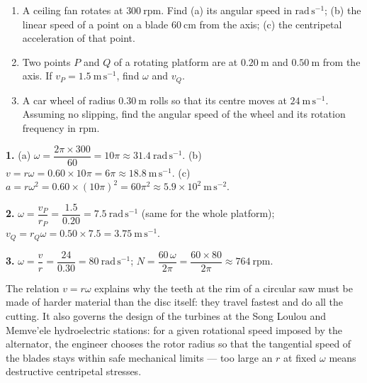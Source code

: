 \documentclass[11pt]{article}
\begin{document}
\begin{exercice}[Practice]
\begin{enumerate}
\item A ceiling fan rotates at $300\ \mathrm{rpm}$. Find (a) its angular speed in $\mathrm{rad\,s^{-1}}$; (b) the linear speed of a point on a blade $60\ \mathrm{cm}$ from the axis; (c) the centripetal acceleration of that point.
\item Two points $P$ and $Q$ of a rotating platform are at $0.20\ \mathrm{m}$ and $0.50\ \mathrm{m}$ from the axis. If $v_P = 1.5\ \mathrm{m\,s^{-1}}$, find $\omega$ and $v_Q$.
\item A car wheel of radius $0.30\ \mathrm{m}$ rolls so that its centre moves at $24\ \mathrm{m\,s^{-1}}$. Assuming no slipping, find the angular speed of the wheel and its rotation frequency in rpm.
\end{enumerate}
\end{exercice}

\begin{corrige}[Exercise 1]
\textbf{1.} (a) $\omega = \dfrac{2\pi \times 300}{60} = 10\pi \approx 31.4\ \mathrm{rad\,s^{-1}}$. (b) $v = r\omega = 0.60 \times 10\pi = 6\pi \approx 18.8\ \mathrm{m\,s^{-1}}$. (c) $a = r\omega^{2} = 0.60 \times (10\pi)^{2} = 60\pi^{2} \approx 5.9\times 10^{2}\ \mathrm{m\,s^{-2}}$.

\textbf{2.} $\omega = \dfrac{v_P}{r_P} = \dfrac{1.5}{0.20} = 7.5\ \mathrm{rad\,s^{-1}}$ (same for the whole platform); $v_Q = r_Q\omega = 0.50 \times 7.5 = 3.75\ \mathrm{m\,s^{-1}}$.

\textbf{3.} $\omega = \dfrac{v}{r} = \dfrac{24}{0.30} = 80\ \mathrm{rad\,s^{-1}}$; $N = \dfrac{60\,\omega}{2\pi} = \dfrac{60 \times 80}{2\pi} \approx 764\ \mathrm{rpm}$.
\end{corrige}

\begin{savaistu}
The relation $v = r\omega$ explains why the teeth at the rim of a circular saw must be made of harder material than the disc itself: they travel fastest and do all the cutting. It also governs the design of the turbines at the Song Loulou and Memve'ele hydroelectric stations: for a given rotational speed imposed by the alternator, the engineer chooses the rotor radius so that the tangential speed of the blades stays within safe mechanical limits --- too large an $r$ at fixed $\omega$ means destructive centripetal stresses.
\end{savaistu}
\end{document}
